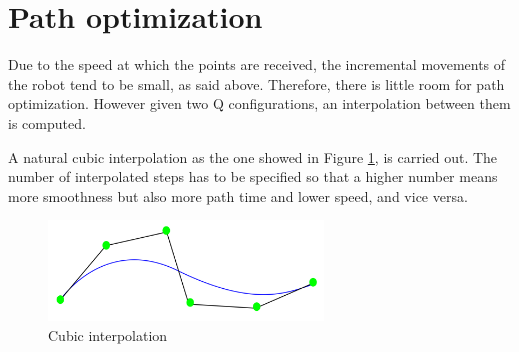 
\section{Path optimization} %
\label{sec:path_optimization}
Due to the speed at which the points are received, the incremental movements of the robot tend to be small, as said above. Therefore, there is little room for path optimization. However given two Q configurations, an interpolation between them is computed.

A natural cubic interpolation as the one showed in Figure \ref{fig:cubic interpolation}, is carried out. The number of interpolated steps has to be specified so that a higher number means more smoothness but also more path time and lower speed, and vice versa.

\begin{figure}[htb]
	\centering
	\includegraphics[width=0.65\textwidth]{figures/cubic_interpolation}
	\caption{Cubic interpolation}
	\label{fig:cubic interpolation}
\end{figure}

